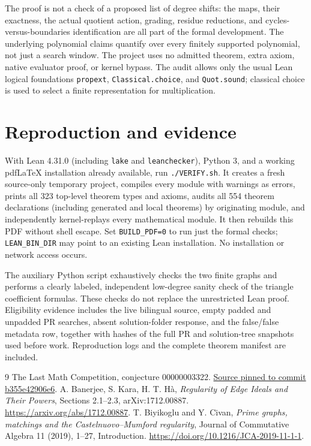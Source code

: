 \documentclass[11pt]{article}
\begin{document}
The proof is not a check of a proposed list of degree shifts: the maps, their exactness, the actual quotient action, grading, residue reductions, and cycles-versus-boundaries identification are all part of the formal development. The underlying polynomial claims quantify over every finitely supported polynomial, not just a search window. The project uses no admitted theorem, extra axiom, native evaluator proof, or kernel bypass. The audit allows only the usual Lean logical foundations \texttt{propext}, \texttt{Classical.choice}, and \texttt{Quot.sound}; classical choice is used to select a finite representation for multiplication.

\section{Reproduction and evidence}
With Lean 4.31.0 (including \texttt{lake} and \texttt{leanchecker}), Python 3, and a working pdfLaTeX installation already available, run \texttt{./VERIFY.sh}. It creates a fresh source-only temporary project, compiles every module with warnings as errors, prints all 323 top-level theorem types and axioms, audits all 554 theorem declarations (including generated and local theorems) by originating module, and independently kernel-replays every mathematical module. It then rebuilds this PDF without shell escape. Set \texttt{BUILD\_PDF=0} to run just the formal checks; \texttt{LEAN\_BIN\_DIR} may point to an existing Lean installation. No installation or network access occurs.

The auxiliary Python script exhaustively checks the two finite graphs and performs a clearly labeled, independent low-degree sanity check of the triangle coefficient formulas. These checks do not replace the unrestricted Lean proof. Eligibility evidence includes the live bilingual source, empty padded and unpadded PR searches, absent solution-folder response, and the false/false metadata row, together with hashes of the full PR and solution-tree snapshots used before work. Reproduction logs and the complete theorem manifest are included.

\begin{thebibliography}{9}
 The Last Math Competition, conjecture 00000003322.
\href{https://github.com/The-Last-Math-Competition/The-Last-Math-Competition/blob/b355e42906e6eaf52bc7e9d005e0ef02d8aa7400/conjectures/00000003322.md}{Source pinned to commit b355e42906e6}.
 A. Banerjee, S. Kara, H. T. H\`a, \emph{Regularity of Edge Ideals and Their Powers}, Sections 2.1--2.3, arXiv:1712.00887.
\url{https://arxiv.org/abs/1712.00887}.
 T. Biyikoglu and Y. Civan, \emph{Prime graphs, matchings and the Castelnuovo--Mumford regularity}, Journal of Commutative Algebra 11 (2019), 1--27, Introduction.
\url{https://doi.org/10.1216/JCA-2019-11-1-1}.
\end{thebibliography}
\end{document}
